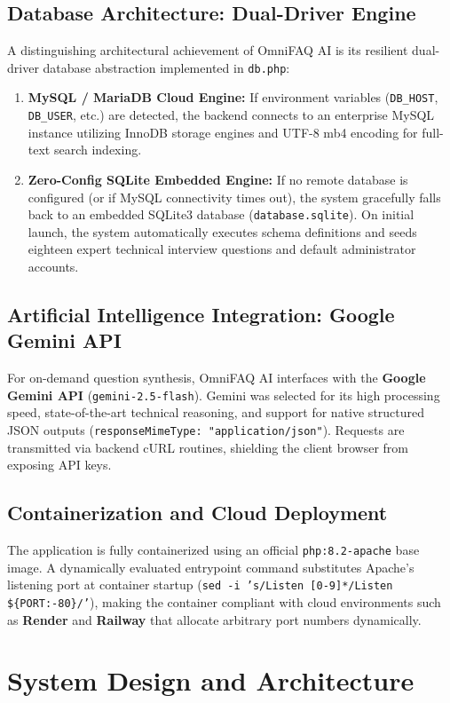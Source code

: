 \documentclass[12pt,a4paper]{report}
\begin{document}
\section{Database Architecture: Dual-Driver Engine}
A distinguishing architectural achievement of OmniFAQ AI is its resilient dual-driver database abstraction implemented in \texttt{db.php}:
\begin{enumerate}
    \item \textbf{MySQL / MariaDB Cloud Engine:} If environment variables (\texttt{DB\_HOST}, \texttt{DB\_USER}, etc.) are detected, the backend connects to an enterprise MySQL instance utilizing InnoDB storage engines and UTF-8 mb4 encoding for full-text search indexing.
    \item \textbf{Zero-Config SQLite Embedded Engine:} If no remote database is configured (or if MySQL connectivity times out), the system gracefully falls back to an embedded SQLite3 database (\texttt{database.sqlite}). On initial launch, the system automatically executes schema definitions and seeds eighteen expert technical interview questions and default administrator accounts.
\end{enumerate}

\section{Artificial Intelligence Integration: Google Gemini API}
For on-demand question synthesis, OmniFAQ AI interfaces with the \textbf{Google Gemini API} (\texttt{gemini-2.5-flash}). Gemini was selected for its high processing speed, state-of-the-art technical reasoning, and support for native structured JSON outputs (\texttt{responseMimeType: "application/json"}). Requests are transmitted via backend cURL routines, shielding the client browser from exposing API keys.

\section{Containerization and Cloud Deployment}
The application is fully containerized using an official \texttt{php:8.2-apache} base image. A dynamically evaluated entrypoint command substitutes Apache's listening port at container startup (\texttt{sed -i 's/Listen [0-9]*/Listen \$\{PORT:-80\}/'}), making the container compliant with cloud environments such as \textbf{Render} and \textbf{Railway} that allocate arbitrary port numbers dynamically.

\chapter{System Design and Architecture}
\label{chap:sys_design}
\end{document}
